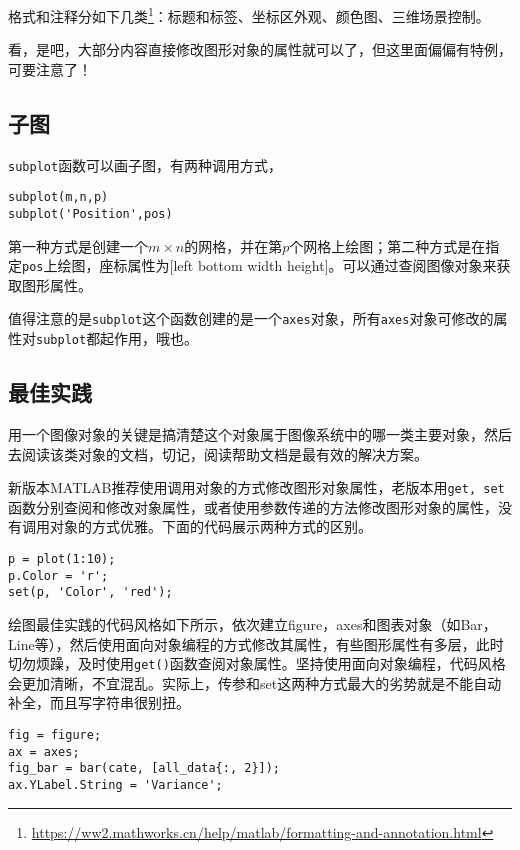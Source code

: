 格式和注释分如下几类\footnote{\url{https://ww2.mathworks.cn/help/matlab/formatting-and-annotation.html}}：标题和标签、坐标区外观、颜色图、三维场景控制。

看，是吧，大部分内容直接修改图形对象的属性就可以了，但这里面偏偏有特例，可要注意了！

\subsection{子图}

\texttt{subplot}函数可以画子图，有两种调用方式，

\begin{verbatim}
subplot(m,n,p)
subplot('Position',pos)
\end{verbatim}

第一种方式是创建一个$ m\times n $的网格，并在第$ p $个网格上绘图；第二种方式是在指定\texttt{pos}上绘图，座标属性为[left bottom width height]。可以通过查阅图像对象来获取图形属性。

值得注意的是\texttt{subplot}这个函数创建的是一个\texttt{axes}对象，所有\texttt{axes}对象可修改的属性对\texttt{subplot}都起作用，哦也。

\subsection{最佳实践}

用一个图像对象的关键是搞清楚这个对象属于图像系统中的哪一类主要对象，然后去阅读该类对象的文档，切记，阅读帮助文档是最有效的解决方案。

新版本MATLAB推荐使用调用对象的方式修改图形对象属性，老版本用\texttt{get, set}函数分别查阅和修改对象属性，或者使用参数传递的方法修改图形对象的属性，没有调用对象的方式优雅。下面的代码展示两种方式的区别。

\begin{verbatim}
p = plot(1:10);
p.Color = 'r';
set(p, 'Color', 'red');
\end{verbatim}

绘图最佳实践的代码风格如下所示，依次建立figure，axes和图表对象（如Bar，Line等），然后使用面向对象编程的方式修改其属性，有些图形属性有多层，此时切勿烦躁，及时使用\texttt{get()}函数查阅对象属性。坚持使用面向对象编程，代码风格会更加清晰，不宜混乱。实际上，传参和set这两种方式最大的劣势就是不能自动补全，而且写字符串很别扭。

\begin{verbatim}
fig = figure;
ax = axes;
fig_bar = bar(cate, [all_data{:, 2}]);
ax.YLabel.String = 'Variance';
\end{verbatim}

